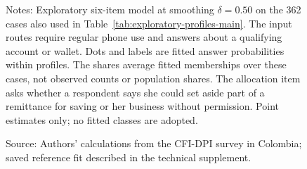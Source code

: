 \begin{figure}[tbp]
\begin{singlespace}

\smallskip
\begin{minipage}{0.95\linewidth}
\footnotesize\raggedright
Notes: Exploratory six-item model at smoothing $\delta=0.50$ on the 362 cases also used in Table~\ref{tab:exploratory-profiles-main}. The input routes require regular phone use and answers about a qualifying account or wallet. Dots and labels are fitted answer probabilities within profiles. The shares average fitted memberships over these cases, not observed counts or population shares. The allocation item asks whether a respondent says she could set aside part of a remittance for saving or her business without permission. Point estimates only; no fitted classes are adopted.\par
Source: Authors' calculations from the CFI-DPI survey in Colombia; saved reference fit described in the technical supplement.\par
\end{minipage}
\end{singlespace}
\end{figure}
